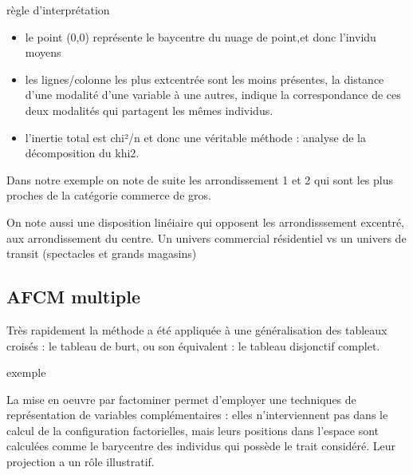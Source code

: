 \documentclass[
]{book}
\newenvironment{Shaded}{\begin{snugshade}}{\end{snugshade}}
\newcommand{\FunctionTok}[1]{\textcolor[rgb]{0.00,0.00,0.00}{#1}}
\newcommand{\NormalTok}[1]{#1}
\newcommand{\SpecialCharTok}[1]{\textcolor[rgb]{0.00,0.00,0.00}{#1}}
\providecommand{\tightlist}{%
  \setlength{\itemsep}{0pt}\setlength{\parskip}{0pt}}
\begin{document}
règle d'interprétation

\begin{itemize}
\tightlist
\item
  le point (0,0) représente le baycentre du nuage de point,et donc l'invidu moyens
\item
  les lignes/colonne les plus extcentrée sont les moins présentes, la distance d'une modalité d'une variable à une autres, indique la correspondance de ces deux modalités qui partagent les mêmes individus.
\item
  l'inertie total est chi²/n et donc une véritable méthode : analyse de la décomposition du khi2.
\end{itemize}

Dans notre exemple on note de suite les arrondissement 1 et 2 qui sont les plus proches de la catégorie commerce de gros.

On note aussi une disposition linéiaire qui opposent les arrondisssement excentré, aux arrondissement du centre. Un univers commercial résidentiel vs un univers de transit (spectacles et grands magasins)

\hypertarget{afcm-multiple}{%
\subsection{AFCM multiple}\label{afcm-multiple}}

Très rapidement la méthode a été appliquée à une généralisation des tableaux croisés : le tableau de burt, ou son équivalent : le tableau disjonctif complet.

exemple

La mise en oeuvre par factominer permet d'employer une techniques de représentation de variables complémentaires : elles n'interviennent pas dans le calcul de la configuration factorielles, mais leurs positions dans l'espace sont calculées comme le barycentre des individus qui possède le trait considéré. Leur projection a un rôle illustratif.

\begin{Shaded}
\end{Shaded}
\end{document}
